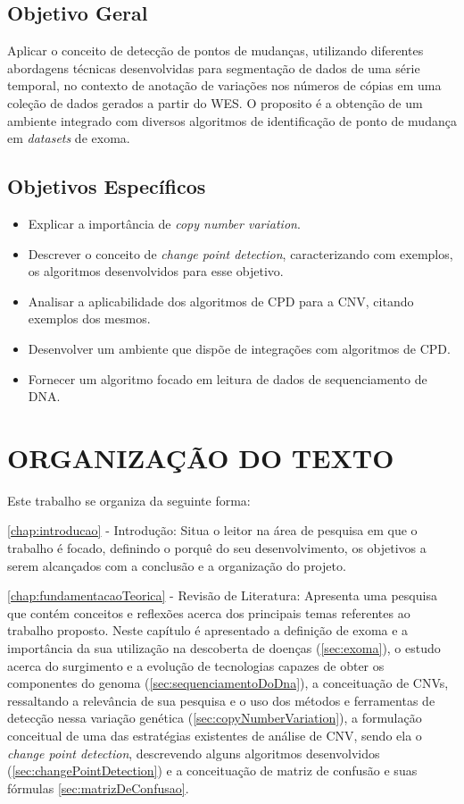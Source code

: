 \subsection{Objetivo Geral}

Aplicar o conceito de detecção de pontos de mudanças, utilizando diferentes abordagens técnicas desenvolvidas para segmentação de dados de uma série temporal, no contexto de anotação de variações nos números de cópias em uma coleção de dados gerados a partir do WES. O proposito é a obtenção de um ambiente integrado com diversos algoritmos de identificação de ponto de mudança em \textit{datasets} de exoma.

\subsection{Objetivos Específicos}
	
\begin{itemize}
    \item Explicar a importância de \textit{copy number variation}.
    \item Descrever o conceito de \textit{change point detection}, caracterizando com exemplos, os algoritmos desenvolvidos para esse objetivo.
    \item Analisar a aplicabilidade dos algoritmos de CPD para a CNV, citando exemplos dos mesmos.
    \item Desenvolver um ambiente que dispõe de integrações com algoritmos de CPD.
    \item Fornecer um algoritmo focado em leitura de dados de sequenciamento de DNA.
\end{itemize}

\section{ORGANIZAÇÃO DO TEXTO}

Este trabalho se organiza da seguinte forma:

\autoref{chap:introducao} - Introdução: Situa o leitor na área de pesquisa em que o trabalho é focado, definindo o porquê do seu desenvolvimento, os objetivos a serem alcançados com a conclusão e a organização do projeto.

\autoref{chap:fundamentacaoTeorica} - Revisão de Literatura: Apresenta uma pesquisa que contém conceitos e reflexões acerca dos principais temas referentes ao trabalho proposto. Neste capítulo é apresentado a definição de exoma e a importância da sua utilização na descoberta de doenças (\autoref{sec:exoma}), o estudo acerca do surgimento e a evolução de tecnologias capazes de obter os componentes do genoma (\autoref{sec:sequenciamentoDoDna}), a conceituação de CNVs, ressaltando a relevância de sua pesquisa e o uso dos métodos e ferramentas de detecção nessa variação genética (\autoref{sec:copyNumberVariation}), a formulação conceitual de uma das estratégias existentes de análise de CNV, sendo ela o \textit{change point detection}, descrevendo alguns algoritmos desenvolvidos (\autoref{sec:changePointDetection}) e a conceituação de matriz de confusão e suas fórmulas \autoref{sec:matrizDeConfusao}.

